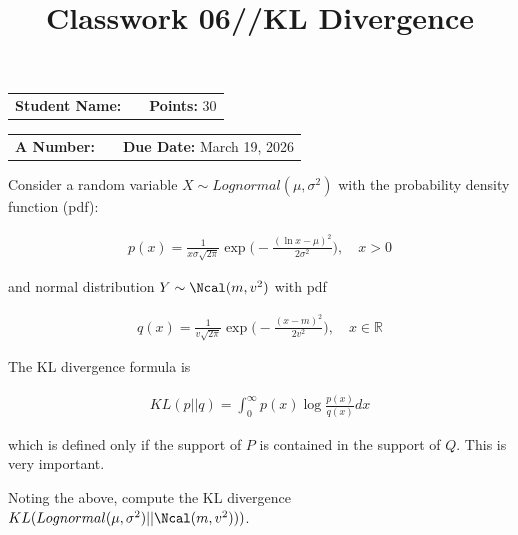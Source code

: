 \documentclass[12pt, xcolor=dvipsnames,svgnames,x11names]{article}
\makeatletter
\newcommand{\hw}{Classwork 06//KL Divergence}
\newcommand{\duedate}{March 19, 2026}
\renewcommand{\maketitle}{%
    \vspace*{0.2cm}
    \begin{center}
        \begin{tcolorbox}[
            enhanced,
            colback=white,
            colframe=headerRed,
            arc=0mm,
            title={\textcolor{white}{\bfseries \@title}},
            coltitle=white,
            fonttitle=\bfseries\large,
            attach boxed title to top left={xshift=10pt, yshift=-\tcboxedtitleheight/2},
            boxed title style={sharp corners, colback=headerRed, frame hidden}
        ]
        \large
        \vspace{10pt}
\noindent
\begin{tabular}{@{}p{3.5cm}p{6cm}r@{}}
\textbf{Student Name:} & \underline{\hspace{6cm}} & \textbf{Points:} 30 \\
\end{tabular}

\vspace{10pt}

\noindent
\begin{tabular}{@{}p{3.5cm}p{6cm}r@{}}
\textbf{A Number:} & \underline{\hspace{6cm}} & \textbf{Due Date:} \duedate \\
\end{tabular}
        \end{tcolorbox}
    \end{center}
    \vspace{10pt}
}
\makeatother
\begin{document}
\title{\hw}
\maketitle


Consider a random variable $X \sim Lognormal(\mu, \sigma^2)$ with the probability density function (pdf):

\begin{align*}
p(x) = \frac{1}{x\sigma \sqrt{2\pi}} \exp \bigg( - \frac{(\ln x - \mu)^2}{2\sigma^2} \bigg), \quad x > 0
\end{align*}

and normal distribution $Y\sim \Ncal (m, v^2)$ with pdf

\begin{align*}
q(x) = \frac{1}{v\sqrt{2\pi}} \exp \bigg( -\frac{(x-m)^2}{2v^2}  \bigg), \quad x\in \mathbb{R}
\end{align*}

The KL divergence formula is 

\begin{align*}
KL(p || q) = \int_0^\infty p(x) \log \frac{p(x)}{q(x)}dx
\end{align*}

which is defined only if the support of $P$ is contained in the support of $Q$. This is very important.

Noting the above, compute the KL divergence $KL(Lognormal(\mu, \sigma^2) ||  \Ncal (m, v^2)))$.
\end{document}

